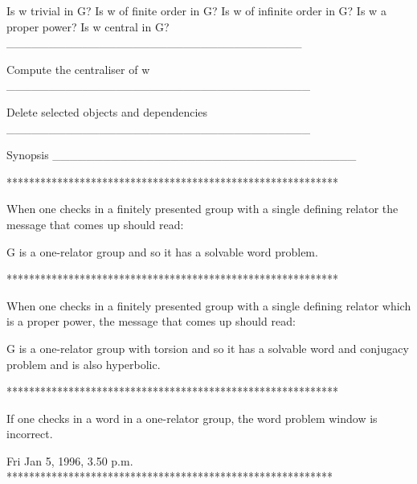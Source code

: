 Is w trivial in G?
Is w of finite order in G?
Is w of infinite order in G?
Is w a proper power?
Is w central in G?
___________________________________

Compute the centraliser of w
____________________________________

Delete selected objects and dependencies
____________________________________

Synopsis
____________________________________



***********************************************************

When one checks in a finitely presented group with a single
defining relator the message that comes up should read:

G is a one-relator group and so it has a solvable word problem.

***********************************************************

When one checks in a finitely presented group with a single
defining relator which is a proper power, the message that 
comes up should read:

G is a one-relator group with torsion and so it has a solvable
word and conjugacy problem and is also hyperbolic.

***********************************************************

If one checks in a word in a one-relator group, the word
problem window is incorrect.

Fri Jan 5, 1996, 3.50 p.m.
**********************************************************








